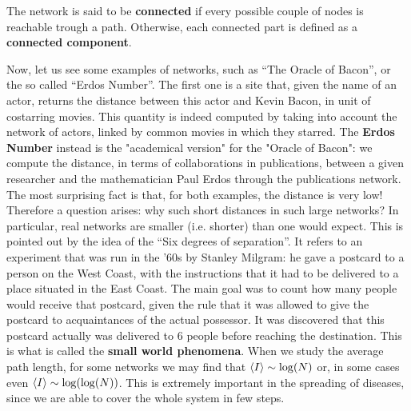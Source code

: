 \documentclass[../main/main.tex]{subfiles}
\begin{document}
The network is said to be \textbf{connected} if every possible couple of nodes is reachable trough a path. Otherwise, each connected part is defined as a \textbf{connected component}.



Now, let us see some examples of networks, such as “The Oracle of Bacon”, or the so called “Erdos Number”. The first one is a site that, given the name of an actor, returns the distance between this actor and Kevin Bacon,  in unit of costarring movies. This quantity is indeed computed by taking into account the network of actors, linked by common movies in which they starred. The \textbf{Erdos Number} instead is the "academical version" for the "Oracle of Bacon": we compute the distance, in terms of collaborations in publications, between a given researcher and the mathematician Paul Erdos through the publications network. The most surprising fact is that, for both examples, the distance is very low! Therefore a question arises: why such short distances in such large networks?
In particular, real networks are smaller (i.e. shorter) than one would expect. This is pointed out by the idea of the “Six degrees of separation”. It refers to an experiment that was run in the '60s by Stanley Milgram: he gave a postcard to a person on the West Coast, with the instructions that it had to be delivered to a place situated in the East Coast. The main goal was to count how many people would receive that postcard, given the rule that it was allowed to give the postcard to acquaintances of the actual possessor. It was discovered that this postcard actually was delivered to 6 people before reaching the destination.
This is what is called the \textbf{small world phenomena}. When we study the average path length, for some networks we may find that $\expval{I} \sim \log(N)$ or, in some cases even $\expval{I} \sim \log(\log(N))$. This is extremely important in the spreading of diseases, since we are able to cover the whole system in few steps.
\end{document}
